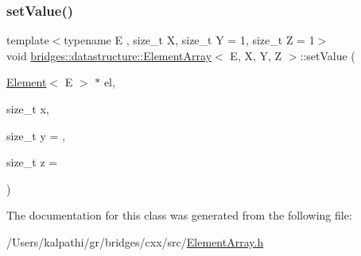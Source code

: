 \mbox{\label{classbridges_1_1datastructure_1_1_element_array_aecd1e6ae5a15c74837f2bfe9d7fbeb60}} 
\subsubsection{\texorpdfstring{setValue()}{setValue()}}
{\footnotesize\ttfamily template$<$typename E , size\+\_\+t X, size\+\_\+t Y = 1, size\+\_\+t Z = 1$>$ \\
void \mbox{\hyperlink{classbridges_1_1datastructure_1_1_element_array}{bridges\+::datastructure\+::\+Element\+Array}}$<$ E, X, Y, Z $>$\+::set\+Value (\begin{DoxyParamCaption}\item[{\mbox{\hyperlink{classbridges_1_1datastructure_1_1_element}{Element}}$<$ E $>$ $\ast$}]{el,  }\item[{size\+\_\+t}]{x,  }\item[{size\+\_\+t}]{y = {},  }\item[{size\+\_\+t}]{z = {} }\end{DoxyParamCaption})\hspace{0.3cm}{\ttfamily [inline]}}



The documentation for this class was generated from the following file\+:\begin{DoxyCompactItemize}
\item 
/\+Users/kalpathi/gr/bridges/cxx/src/\mbox{\hyperlink{_element_array_8h}{Element\+Array.\+h}}\end{DoxyCompactItemize}
